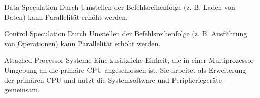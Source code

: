 \begin{defi}{Data Speculation}
    Durch Umstellen der Befehlsreihenfolge (z. B. Laden von Daten) kann Parallelität erhöht werden.
\end{defi}

\begin{defi}{Control Speculation}
    Durch Umstellen der Befehlsreihenfolge (z. B. Ausführung von Operationen) kann Parallelität erhöht werden.
\end{defi}

\begin{defi}{Attached-Processor-Systeme}
    Eine zusätzliche Einheit, 
    die in einer Multiprozessor-Umgebung an die primäre CPU angeschlossen ist. 
    Sie arbeitet als Erweiterung der primären CPU und 
    nutzt die Systemsoftware und Peripheriegeräte gemeinsam.
\end{defi}